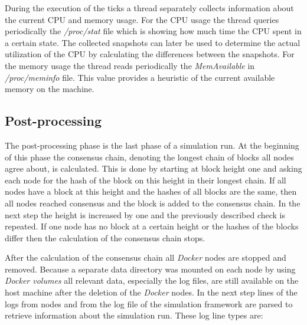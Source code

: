 During the execution of the ticks a thread separately collects information about the current CPU and memory usage.
For the CPU usage the thread queries periodically the \textit{/proc/stat} file which is showing how much time the CPU spent in a certain state. 
The collected snapshots can later be used to determine the actual utilization of the CPU by calculating the differences between the snapshots.
For the memory usage the thread reads periodically the \textit{MemAvailable} in \textit{/proc/meminfo} file.
This value provides a heuristic of the current available memory on the machine.

\subsection{Post-processing}

The post-processing phase is the last phase of a simulation run.
At the beginning of this phase the consensus chain, denoting the longest chain of blocks all nodes agree about, is calculated.
This is done by starting at block height one and asking each node for the hash of the block on this height in their longest chain.
If all nodes have a block at this height and the hashes of all blocks are the same, then all nodes reached consensus and the block is added to the consensus chain.
In the next step the height is increased by one and the previously described check is repeated.
If one node has no block at a certain height or the hashes of the blocks differ then the calculation of the consensus chain stops.

After the calculation of the consensus chain all \textit{Docker} nodes are stopped and removed.
Because a separate data directory was mounted on each node by using \textit{Docker volumes} all relevant data, especially the log files, are still available on the host machine after the deletion of the \textit{Docker} nodes.
In the next step lines of the logs from nodes and from the log file of the simulation framework are parsed to retrieve information about the simulation run.
These log line types are:

